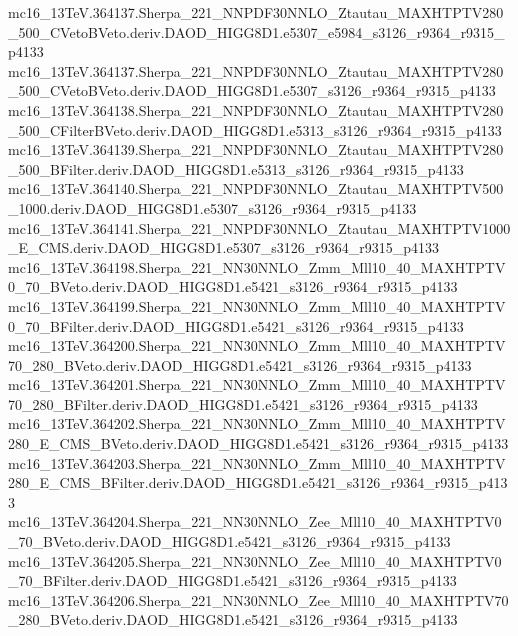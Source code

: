 \begin{scriptsize}
mc16\_13TeV.364137.Sherpa\_221\_NNPDF30NNLO\_Ztautau\_MAXHTPTV280\_500\_CVetoBVeto.deriv.DAOD\_HIGG8D1.e5307\_e5984\_s3126\_r9364\_r9315\_p4133 \\
mc16\_13TeV.364137.Sherpa\_221\_NNPDF30NNLO\_Ztautau\_MAXHTPTV280\_500\_CVetoBVeto.deriv.DAOD\_HIGG8D1.e5307\_s3126\_r9364\_r9315\_p4133 \\
mc16\_13TeV.364138.Sherpa\_221\_NNPDF30NNLO\_Ztautau\_MAXHTPTV280\_500\_CFilterBVeto.deriv.DAOD\_HIGG8D1.e5313\_s3126\_r9364\_r9315\_p4133 \\
mc16\_13TeV.364139.Sherpa\_221\_NNPDF30NNLO\_Ztautau\_MAXHTPTV280\_500\_BFilter.deriv.DAOD\_HIGG8D1.e5313\_s3126\_r9364\_r9315\_p4133 \\
mc16\_13TeV.364140.Sherpa\_221\_NNPDF30NNLO\_Ztautau\_MAXHTPTV500\_1000.deriv.DAOD\_HIGG8D1.e5307\_s3126\_r9364\_r9315\_p4133 \\
mc16\_13TeV.364141.Sherpa\_221\_NNPDF30NNLO\_Ztautau\_MAXHTPTV1000\_E\_CMS.deriv.DAOD\_HIGG8D1.e5307\_s3126\_r9364\_r9315\_p4133 \\
mc16\_13TeV.364198.Sherpa\_221\_NN30NNLO\_Zmm\_Mll10\_40\_MAXHTPTV0\_70\_BVeto.deriv.DAOD\_HIGG8D1.e5421\_s3126\_r9364\_r9315\_p4133 \\
mc16\_13TeV.364199.Sherpa\_221\_NN30NNLO\_Zmm\_Mll10\_40\_MAXHTPTV0\_70\_BFilter.deriv.DAOD\_HIGG8D1.e5421\_s3126\_r9364\_r9315\_p4133 \\
mc16\_13TeV.364200.Sherpa\_221\_NN30NNLO\_Zmm\_Mll10\_40\_MAXHTPTV70\_280\_BVeto.deriv.DAOD\_HIGG8D1.e5421\_s3126\_r9364\_r9315\_p4133 \\
mc16\_13TeV.364201.Sherpa\_221\_NN30NNLO\_Zmm\_Mll10\_40\_MAXHTPTV70\_280\_BFilter.deriv.DAOD\_HIGG8D1.e5421\_s3126\_r9364\_r9315\_p4133 \\
mc16\_13TeV.364202.Sherpa\_221\_NN30NNLO\_Zmm\_Mll10\_40\_MAXHTPTV280\_E\_CMS\_BVeto.deriv.DAOD\_HIGG8D1.e5421\_s3126\_r9364\_r9315\_p4133 \\
mc16\_13TeV.364203.Sherpa\_221\_NN30NNLO\_Zmm\_Mll10\_40\_MAXHTPTV280\_E\_CMS\_BFilter.deriv.DAOD\_HIGG8D1.e5421\_s3126\_r9364\_r9315\_p4133 \\
mc16\_13TeV.364204.Sherpa\_221\_NN30NNLO\_Zee\_Mll10\_40\_MAXHTPTV0\_70\_BVeto.deriv.DAOD\_HIGG8D1.e5421\_s3126\_r9364\_r9315\_p4133 \\
mc16\_13TeV.364205.Sherpa\_221\_NN30NNLO\_Zee\_Mll10\_40\_MAXHTPTV0\_70\_BFilter.deriv.DAOD\_HIGG8D1.e5421\_s3126\_r9364\_r9315\_p4133 \\
mc16\_13TeV.364206.Sherpa\_221\_NN30NNLO\_Zee\_Mll10\_40\_MAXHTPTV70\_280\_BVeto.deriv.DAOD\_HIGG8D1.e5421\_s3126\_r9364\_r9315\_p4133 \\

\end{scriptsize}
